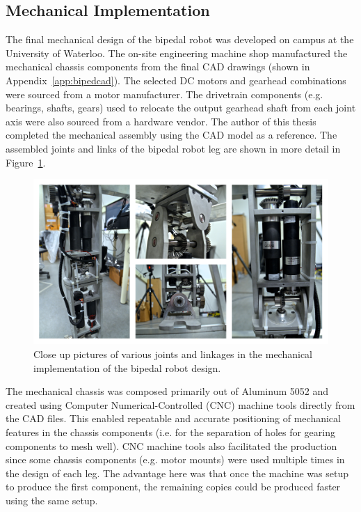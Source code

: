 \subsection{Mechanical Implementation} %
\label{sub:mechanical_implementation}

The final mechanical design of the bipedal robot was developed on campus at the University of Waterloo. The on-site engineering machine shop manufactured the mechanical chassis components from the final CAD drawings (shown in Appendix~\ref{app:bipedcad}). The selected DC motors and gearhead combinations were sourced from a motor manufacturer. The drivetrain components (e.g. bearings, shafts, gears) used to relocate the output gearhead shaft from each joint axis were also sourced from a hardware vendor. The author of this thesis completed the mechanical assembly using the CAD model as a reference. The assembled joints and links of the bipedal robot leg are shown in more detail in Figure~\ref{fig:bipedcloseup}.

\begin{figure}[!h]
	\centering
    \includegraphics[scale=0.38]{fig/hardware/bipedcloseup.png} 
  	\caption{Close up pictures of various joints and linkages in the mechanical implementation of the bipedal robot design.}
	\label{fig:bipedcloseup}
\end{figure}

The mechanical chassis was composed primarily out of Aluminum 5052 and created using Computer Numerical-Controlled (CNC) machine tools directly from the CAD files. This enabled repeatable and accurate positioning of mechanical features in the chassis components (i.e. for the separation of holes for gearing components to mesh well). CNC machine tools also facilitated the production since some chassis components (e.g. motor mounts) were used multiple times in the design of each leg. The advantage here was that once the machine was setup to produce the first component, the remaining copies could be produced faster using the same setup. 

